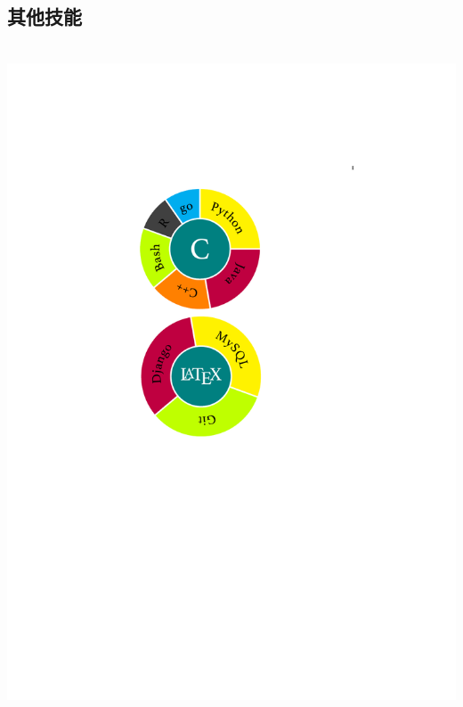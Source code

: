 \documentclass[]{friggeri-cv}
\begin{document}
\begin{aside}
  \section{\cuti 其他技能}
    ~
    \includegraphics[scale=0.62]{img/personal.pdf}
    ~

\end{aside}
\end{document}
